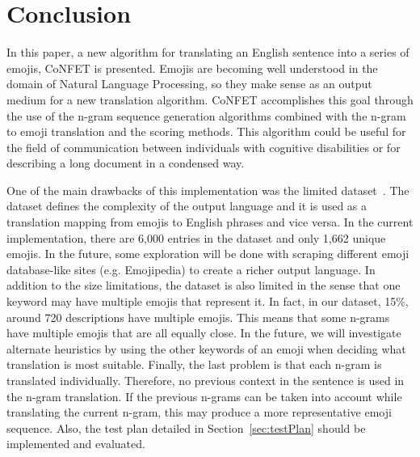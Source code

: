 \documentclass{article}[10]
\begin{document}
\section{Conclusion}

In this paper, a new algorithm for translating an English sentence into a series of emojis, CoNFET is presented. Emojis are becoming well understood in the domain of Natural Language Processing, so they make sense as an output medium for a new translation algorithm. CoNFET accomplishes this goal through the use of the n-gram sequence generation algorithms combined with the n-gram to emoji translation and the scoring methods. This algorithm could be useful for the field of communication between individuals with cognitive disabilities or for describing a long document in a condensed way.

One of the main drawbacks of this implementation was the limited dataset~\cite{Eisner_2016}. The dataset defines the complexity of the output language and it is used as a translation mapping from emojis to English phrases and vice versa. In the current implementation, there are 6,000 entries in the dataset and only 1,662 unique emojis. In the future, some exploration will be done with scraping different emoji database-like sites (e.g. Emojipedia) to create a richer output language. In addition to the size limitations, the dataset is also limited in the sense that one keyword may have multiple emojis that represent it. In fact, in our dataset, 15\%, around 720 descriptions have multiple emojis. This means that some n-grams have multiple emojis that are all equally close. In the future, we will investigate alternate heuristics by using the other keywords of an emoji when deciding what translation is most suitable. Finally, the last problem is that each n-gram is translated individually. Therefore, no previous context in the sentence is used in the n-gram translation. If the previous n-grams can be taken into account while translating the current n-gram, this may produce a more representative emoji sequence. Also, the test plan detailed in Section~\ref{sec:testPlan} should be implemented and evaluated.

\makeatother


\end{document}
